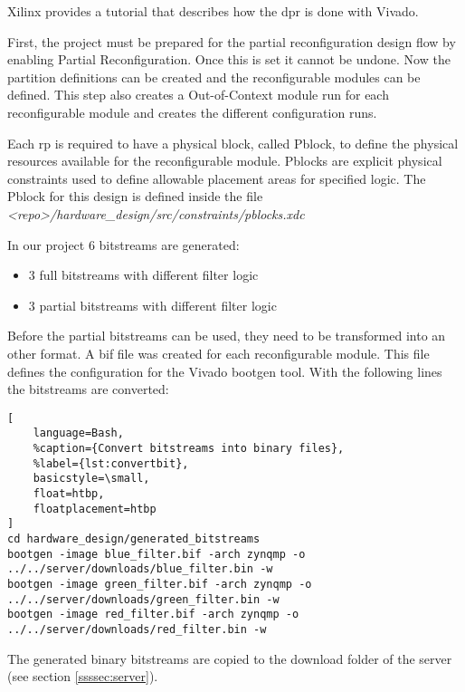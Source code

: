 Xilinx provides a tutorial \cite{UG947} that describes how the \gls{dpr} is done with Vivado. 

First, the project must be prepared for the partial reconfiguration design flow by enabling Partial Reconfiguration. Once this is set it cannot be undone. Now the partition definitions can be created and the reconfigurable modules can be defined. This step also creates a Out-of-Context module run for each reconfigurable module and creates the different configuration runs.

Each \gls{rp} is required to have a physical block, called Pblock, to define the physical resources available for the reconfigurable module. Pblocks are explicit physical constraints used to define allowable placement areas for specified logic. The Pblock for this design is defined inside the file\\\emph{<repo>/hardware\_design/src/constraints/pblocks.xdc}

In our project $6$ bitstreams are generated:
\begin{itemize}
	\item $3$ full bitstreams with different filter logic
	\item $3$ partial bitstreams with different filter logic
\end{itemize}

Before the partial bitstreams can be used, they need to be transformed into an other format. A \gls{bif} file was created for each reconfigurable module. This file defines the configuration for the Vivado bootgen tool. With the following lines the bitstreams are converted:

\begin{lstlisting}[
    language=Bash,
    %caption={Convert bitstreams into binary files},
    %label={lst:convertbit},
    basicstyle=\small,
    float=htbp,
    floatplacement=htbp
]
cd hardware_design/generated_bitstreams
bootgen -image blue_filter.bif -arch zynqmp -o ../../server/downloads/blue_filter.bin -w
bootgen -image green_filter.bif -arch zynqmp -o ../../server/downloads/green_filter.bin -w
bootgen -image red_filter.bif -arch zynqmp -o ../../server/downloads/red_filter.bin -w
\end{lstlisting}
\FloatBarrier

The generated binary bitstreams are copied to the download folder of the server (see section \ref{ssssec:server}).